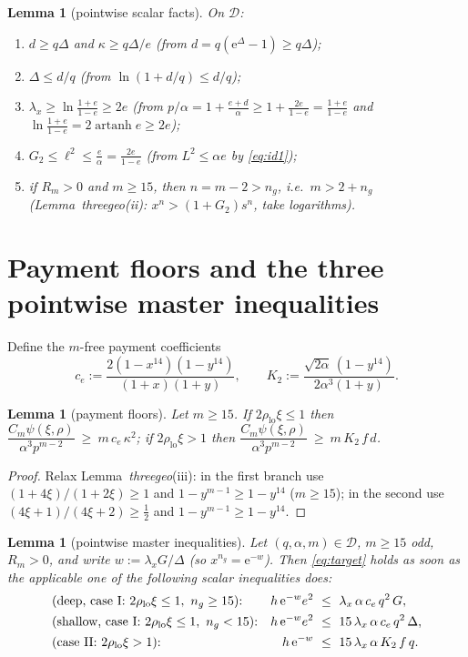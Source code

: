 \documentclass[11pt]{amsart}
\newtheorem{lemma}[theorem]{Lemma}
\newcommand{\eu}{\mathrm{e}}
\newcommand{\D}{\mathcal D}
\begin{document}
\begin{lemma}[pointwise scalar facts]\label{lem:scalar}
On $\D$:
\begin{enumerate}
\item[(i)] $d\ge q\Delta$ and $\kappa\ge q\Delta/e$
  \quad(from $d=q(\eu^\Delta-1)\ge q\Delta$);
\item[(ii)] $\Delta\le d/q$ \quad(from $\ln(1+d/q)\le d/q$);
\item[(iii)] $\lambda_x\ge\ln\frac{1+e}{1-e}\ge2e$
  \quad(from $p/\alpha=1+\frac{e+d}\alpha\ge1+\frac{2e}{1-e}=\frac{1+e}{1-e}$
  and $\ln\frac{1+e}{1-e}=2\operatorname{artanh}e\ge2e$);
\item[(iv)] $G_2\le\ell^2\le\frac e\alpha=\frac{2e}{1-e}$
  \quad(from $L^2\le\alpha e$ by \eqref{eq:id1});
\item[(v)] if $R_m>0$ and $m\ge15$, then $n=m-2>n_g$, i.e.\ $m>2+n_g$
  \quad(Lemma~\emph{threegeo}(ii): $x^n>(1+G_2)s^n$, take logarithms).
\end{enumerate}
\end{lemma}

\section{Payment floors and the three pointwise master inequalities}
\label{sec:master}

Define the $m$-free payment coefficients
\[
 c_e:=\frac{2(1-x^{14})(1-y^{14})}{(1+x)(1+y)},
 \qquad
 K_2:=\frac{\sqrt{2\alpha}\,(1-y^{14})}{2\alpha^3(1+y)} .
\]

\begin{lemma}[payment floors]\label{lem:payfloor}
Let $m\ge15$.  If $2\rho_{\mathrm{lo}}\xi\le1$ then
$\dfrac{C_m\psi(\xi,\rho)}{\alpha^3p^{m-2}}\ \ge\ m\,c_e\,\kappa^2$;
if $2\rho_{\mathrm{lo}}\xi>1$ then
$\dfrac{C_m\psi(\xi,\rho)}{\alpha^3p^{m-2}}\ \ge\ m\,K_2\,f\,d$.
\end{lemma}

\begin{proof}
Relax Lemma~\emph{threegeo}(iii): in the first branch use
$(1+4\xi)/(1+2\xi)\ge1$ and $1-y^{m-1}\ge1-y^{14}$ ($m\ge15$); in the second
use $(4\xi+1)/(4\xi+2)\ge\tfrac12$ and $1-y^{m-1}\ge1-y^{14}$.
\end{proof}

\begin{lemma}[pointwise master inequalities]\label{lem:master}
Let $(q,\alpha,m)\in\D$, $m\ge15$ odd, $R_m>0$, and write $w:=\lambda_xG/\Delta$
(so $x^{n_g}=\eu^{-w}$).  Then \eqref{eq:target} holds as soon as the
applicable one of the following scalar inequalities does:
\begin{align}
 &\textup{(deep, case I: }2\rho_{\mathrm{lo}}\xi\le1,\ n_g\ge15\textup{):}
 &h\,\eu^{-w}e^2\ &\le\ \lambda_x\,\alpha\,c_e\,q^2\,G,
 \label{eq:SCdeep}\\
 &\textup{(shallow, case I: }2\rho_{\mathrm{lo}}\xi\le1,\ n_g<15\textup{):}
 &h\,\eu^{-w}e^2\ &\le\ 15\,\lambda_x\,\alpha\,c_e\,q^2\,\Delta,
 \label{eq:SCsh}\\
 &\textup{(case II: }2\rho_{\mathrm{lo}}\xi>1\textup{):}
 &h\,\eu^{-w}\ &\le\ 15\,\lambda_x\,\alpha\,K_2\,f\,q.
 \label{eq:SCII}
\end{align}
\end{lemma}
\end{document}
